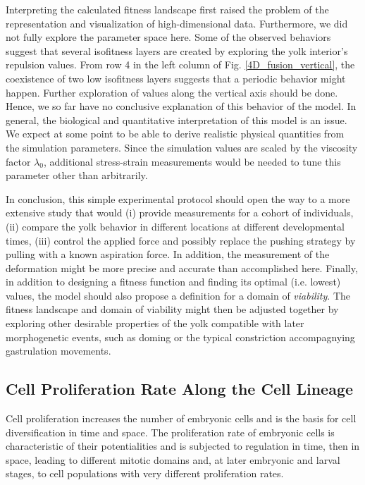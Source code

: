 Interpreting the calculated fitness landscape first raised the problem of the representation and visualization of high-dimensional data. Furthermore, we did not fully explore the parameter space here. Some of the observed behaviors suggest that several isofitness layers are created by exploring the yolk interior's repulsion values. From row 4 in the left column of Fig. \ref{4D_fusion_vertical}, the coexistence of two low isofitness layers suggests that a periodic behavior might happen. Further exploration of values along the vertical axis should be done. Hence, we so far have no conclusive explanation of this behavior of the model. In general, the biological and quantitative interpretation of this model is an issue. We expect at some point to be able to derive realistic physical quantities from the simulation parameters. Since the simulation values are scaled by the viscosity factor $\lambda_0$, additional stress-strain measurements would be needed to tune this parameter other than arbitrarily.

In conclusion, this simple experimental protocol should open the way to a more extensive study that would (i) provide measurements for a cohort of individuals, (ii) compare the yolk behavior in different locations at different developmental times, (iii) control the applied force and possibly replace the pushing strategy by pulling with a known aspiration force. In addition, the measurement of the deformation might be more precise and accurate than accomplished here. Finally, in addition to designing a fitness function and finding its optimal (i.e. lowest) values, the model should also propose a definition for a domain of \textit{viability}. The fitness landscape and domain of viability might then be adjusted together by exploring other desirable properties of the yolk compatible with later morphogenetic events, such as doming or the typical constriction accompagnying gastrulation movements.


\subsection{Cell Proliferation Rate Along the Cell Lineage}


Cell proliferation increases the number of embryonic cells and is the basis for cell diversification in time and space. The proliferation rate of embryonic cells is characteristic of their potentialities and is subjected to regulation in time, then in space, leading to different mitotic domains and, at later embryonic and larval stages, to cell populations with very different proliferation rates.

